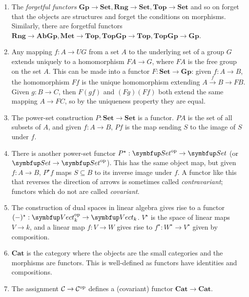 \begin{example}
    \begin{enumerate}
        \item The \emph{forgetful functors} \( \mathbf{Gp} \to \mathbf{Set}, \mathbf{Rng} \to \mathbf{Set}, \mathbf{Top} \to \mathbf{Set} \) and so on forget that the objects are structures and forget the conditions on morphisms.
        Similarly, there are forgetful functors \( \mathbf{Rng} \to \mathbf{AbGp}, \mathbf{Met} \to \mathbf{Top}, \mathbf{TopGp} \to \mathbf{Top}, \mathbf{TopGp} \to \mathbf{Gp} \).
        \item Any mapping \( f : A \to UG \) from a set \( A \) to the underlying set of a group \( G \) extends uniquely to a homomorphism \( FA \to G \), where \( FA \) is the free group on the set \( A \).
        This can be made into a functor \( F : \mathbf{Set} \to \mathbf{Gp} \): given \( f : A \to B \), the homomorphism \( Ff \) is the unique homomorphism extending \( A \xrightarrow f B \to FB \).
        Given \( g : B \to C \), then \( F(gf) \) and \( (Fg)(Ff) \) both extend the same mapping \( A \to FC \), so by the uniqueness property they are equal.
        \item The power-set construction \( P : \mathbf{Set} \to \mathbf{Set} \) is a functor.
        \( PA \) is the set of all subsets of \( A \), and given \( f : A \to B \), \( Pf \) is the map sending \( S \) to the image of \( S \) under \( f \).
        \item There is another power-set functor \( P^\star : \mathbf{Set}^\cop \to \mathbf{Set} \) (or \( \mathbf{Set} \to \mathbf{Set}^\cop \)).
        This has the same object map, but given \( f : A \to B \), \( P^\star f \) maps \( S \subseteq B \) to its inverse image under \( f \).
        A functor like this that reverses the direction of arrows is sometimes called \emph{contravariant}; functors which do not are called \emph{covariant}.
        \item The construction of dual spaces in linear algebra gives rise to a functor \( (-)^\star : \mathbf{Vect}_k^\cop \to \mathbf{Vect}_k \).
        \( V^\star \) is the space of linear maps \( V \to k \), and a linear map \( f : V \to W \) gives rise to \( f^\star : W^\star \to V^\star \) given by composition.
        \item \( \mathbf{Cat} \) is the category where the objects are the small categories and the morphisms are functors.
        This is well-defined as functors have identities and compositions.
        \item The assignment \( \mathcal C \to \mathcal C^{\mathrm{op}} \) defines a (covariant) functor \( \mathbf{Cat} \to \mathbf{Cat} \).

\end{enumerate}
\end{example}
